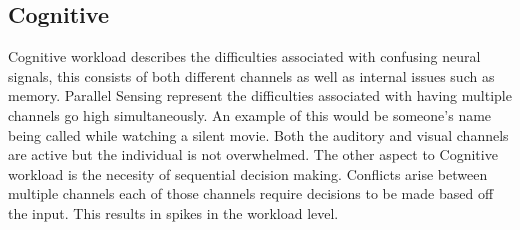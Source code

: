 \subsection{Cognitive}
Cognitive workload describes the difficulties associated with confusing neural signals, this consists of both different channels as well as internal issues such as memory. Parallel Sensing represent the difficulties associated with having multiple channels go high simultaneously. An example of this would be someone's name being called while watching a silent movie. Both the auditory and visual channels are active but the individual is not overwhelmed. The other aspect to Cognitive workload is the necesity of sequential decision making. Conflicts arise between multiple channels each of those channels require decisions to be made based off the input. This results in spikes in the workload level.